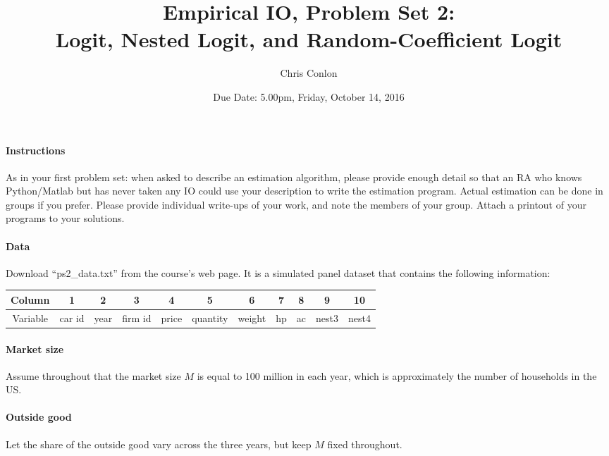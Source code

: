 \documentclass[12pt]{article}
\begin{document}
\title{Empirical IO, Problem Set 2:\\
 Logit, Nested Logit, and Random-Coefficient Logit}
\author{Chris Conlon}
\date{Due Date: 5.00pm, Friday, October 14, 2016}
\maketitle

\paragraph{Instructions} As in your first problem set: when asked to describe an estimation algorithm, please provide enough detail so that an RA who knows Python/Matlab but has never taken any IO could use your description to write the estimation program. Actual estimation can be done in groups if you prefer. Please provide individual write-ups of your work, and note the members of your group. Attach a printout of your programs to your solutions.

\paragraph{Data} Download ``ps2\_data.txt'' from the course's web page. It is a simulated panel dataset that contains the following information:

\begin{table}[htb]
\center
\begin{tabular}{|c|c|c|c|c|c|c|c|c|c|c|}
\hline
Column & 1 & 2 & 3 & 4 & 5 & 6 & 7 & 8 & 9 & 10\\ \hline
 Variable & car id & year & firm id & price & quantity & weight & hp & ac & nest3 & nest4\\
\hline
\end{tabular}
\end{table} 
\paragraph{Market size} Assume throughout that the market size $M$ is equal to 100 million in each year, which is approximately the number of households in the US.

\paragraph{Outside good} Let the share of the outside good vary across the three years, but keep $M$ fixed throughout.


\end{document}
